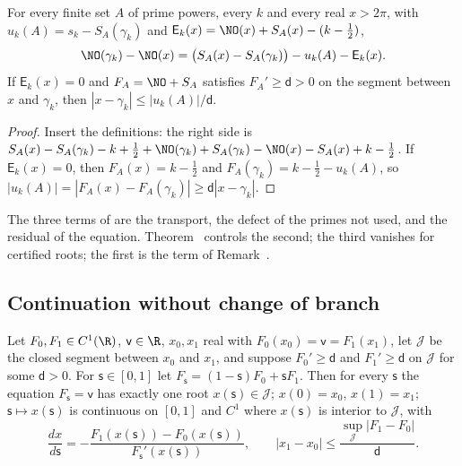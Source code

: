 \begin{proposition}\label{prop:residual_identity}
For every finite set $A$ of prime powers, every $k$ and every real $x>2\pi$, with $u_k(A)=s_k-S_A(\gamma_k)$ and $\mathsf E_k(x)=\NO(x)+S_A(x)-(k-\frac12)$,
\begin{equation}
\NO(\gamma_k)-\NO(x)=\bigl(S_A(x)-S_A(\gamma_k)\bigr)-u_k(A)-\mathsf E_k(x).
\label{eq:residual_identity}
\end{equation}
If $\mathsf E_k(x)=0$ and $F_A=\NO+S_A$ satisfies $F_A'\ge\mathsf d>0$ on the segment between $x$ and $\gamma_k$, then $|x-\gamma_k|\le|u_k(A)|/\mathsf d$.
\end{proposition}

\begin{proof}
Insert the definitions: the right side is $S_A(x)-S_A(\gamma_k)-k+\frac12+\NO(\gamma_k)+S_A(\gamma_k)-\NO(x)-S_A(x)+k-\frac12$. If $\mathsf E_k(x)=0$, then $F_A(x)=k-\frac12$ and $F_A(\gamma_k)=k-\frac12-u_k(A)$, so $|u_k(A)|=|F_A(x)-F_A(\gamma_k)|\ge\mathsf d|x-\gamma_k|$.
\end{proof}

The three terms of  are the transport, the defect of the primes not used, and the residual of the equation. Theorem~ controls the second; the third vanishes for certified roots; the first is the term of Remark~.

\subsection{Continuation without change of branch}
\begin{theorem}\label{thm:continuation}
Let $F_0,F_1\in C^1(\R)$, $\mathsf v\in\R$, $x_0,x_1$ real with $F_0(x_0)=\mathsf v=F_1(x_1)$, let $\mathscr J$ be the closed segment between $x_0$ and $x_1$, and suppose $F_0'\ge\mathsf d$ and $F_1'\ge\mathsf d$ on $\mathscr J$ for some $\mathsf d>0$. For $\mathsf s\in[0,1]$ let $F_{\mathsf s}=(1-\mathsf s)F_0+\mathsf sF_1$. Then for every $\mathsf s$ the equation $F_{\mathsf s}=\mathsf v$ has exactly one root $x(\mathsf s)\in\mathscr J$; $x(0)=x_0$, $x(1)=x_1$; $\mathsf s\mapsto x(\mathsf s)$ is continuous on $[0,1]$ and $C^1$ where $x(\mathsf s)$ is interior to $\mathscr J$, with
\begin{equation}
\frac{dx}{d\mathsf s}=-\frac{F_1(x(\mathsf s))-F_0(x(\mathsf s))}{F_{\mathsf s}'(x(\mathsf s))},\qquad |x_1-x_0|\le\frac{\sup_{\mathscr J}|F_1-F_0|}{\mathsf d}.
\label{eq:continuation}
\end{equation}
\end{theorem}

